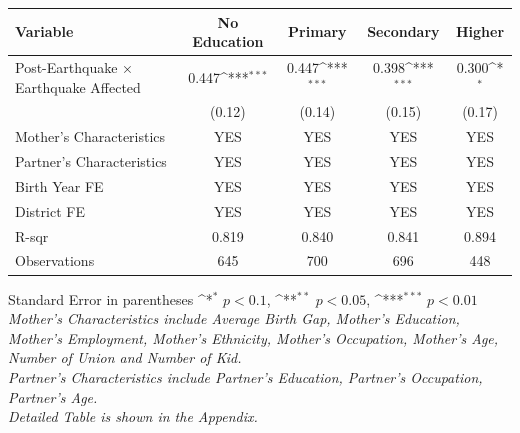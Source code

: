 \def\sym#1{\ifmmode^{#1}\else\(^{#1}\)\fi}
\renewcommand{\arraystretch}{1.4}
\small
\setlength{\tabcolsep}{6pt}

\begin{flushleft}
\begin{tabular}{@{}p{8cm}*{4}{c}@{}}
\hline\hline
Variable & No Education & Primary & Secondary & Higher \\
\hline
Post-Earthquake × Earthquake Affected & 0.447\sym{***} & 0.447\sym{***} & 0.398\sym{***} & 0.300\sym{*} \\
                                      & (0.12) & (0.14) & (0.15) & (0.17) \\
\hline
Mother's Characteristics              & YES & YES & YES & YES \\
Partner's Characteristics             & YES & YES & YES & YES \\
\hline
Birth Year FE                         & YES & YES & YES & YES \\
District FE                           & YES & YES & YES & YES \\
R-sqr                                 & 0.819 & 0.840 & 0.841 & 0.894 \\
Observations                          & 645 & 700 & 696 & 448 \\
\hline\hline
\end{tabular}

\vspace{4pt}
\noindent\footnotesize
Standard Error in parentheses \sym{*} \(p<0.1\), \sym{**} \(p<0.05\), \sym{***} \(p<0.01\)\\
\textit{Mother’s Characteristics include Average Birth Gap, Mother’s Education, Mother’s Employment, Mother’s Ethnicity, Mother’s Occupation, Mother’s Age, Number of Union and Number of Kid.}\\
\textit{Partner’s Characteristics include Partner’s Education, Partner’s Occupation, Partner’s Age.}\\
\textit{Detailed Table is shown in the Appendix.}
\end{flushleft}
